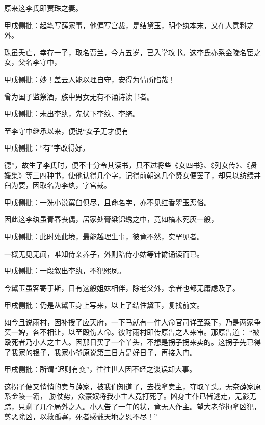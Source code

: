 \begin{parag}
    原来这李氏即贾珠之妻。\begin{note}甲戌侧批：起笔写薛家事，他偏写宫裁，是结黛玉，明李纨本末，又在人意料之外。\end{note}珠虽夭亡，幸存一子，取名贾兰，今方五岁，已入学攻书。这李氏亦系金陵名宦之女，父名李守中，\begin{note}甲戌侧批：妙！盖云人能以理自守，安得为情所陷哉！\end{note}曾为国子监祭酒，族中男女无有不诵诗读书者。\begin{note}甲戌侧批：未出李纨，先伏下李纹、李绮。\end{note}至李守中继承以来，便说“女子无才便有\begin{note}甲戌侧批：“有”字改得好。\end{note}德”，故生了李氏时，便不十分令其读书，只不过将些《女四书》、《列女传》、《贤媛集》等三四种书，使他认得几个字，记得前朝这几个贤女便罢了，却只以纺绩井臼为要，因取名为李纨，字宫裁。\begin{note}甲戌侧批：一洗小说窠臼俱尽，且命名字，亦不见红香翠玉恶俗。\end{note}因此这李纨虽青春丧偶，居家处膏粱锦绣之中，竟如槁木死灰一般，\begin{note}甲戌侧批：此时处此境，最能越理生事，彼竟不然，实罕见者。\end{note}一概无见无闻，唯知侍亲养子，外则陪侍小姑等针黹诵读而已。\begin{note}甲戌侧批：一段叙出李纨，不犯熙凤。\end{note}今黛玉虽客寄于斯，日有这般姐妹相伴，除老父外，余者也都无庸虑及了。\begin{note}甲戌侧批：仍是从黛玉身上写来，以上了结住黛玉，复找前文。\end{note}
\end{parag}


\begin{parag}
    如今且说雨村，因补授了应天府，一下马就有一件人命官司详至案下，乃是两家争买一婢，各不相让，以至殴伤人命。彼时雨村即传原告之人来审。那原告道： “被殴死者乃小人之主人。因那日买了一个丫头，不想是拐子拐来卖的。这拐子先已得了我家的银子，我家小爷原说第三日方是好日子，再接入门。\begin{note}甲戌侧批：所谓“迟则有变”，往往世人因不经之谈误却大事。\end{note}这拐子便又悄悄的卖与薛家，被我们知道了，去找拿卖主，夺取丫头。无奈薛家原系金陵一霸， 胁仗势，众豪奴将我小主人竟打死了。凶身主仆已皆逃走，无影无踪，只剩了几个局外之人。小人告了一年的状，竟无人作主。望大老爷拘拿凶犯，剪恶除凶，以救孤寡，死者感戴天地之恩不尽！”
\end{parag}


